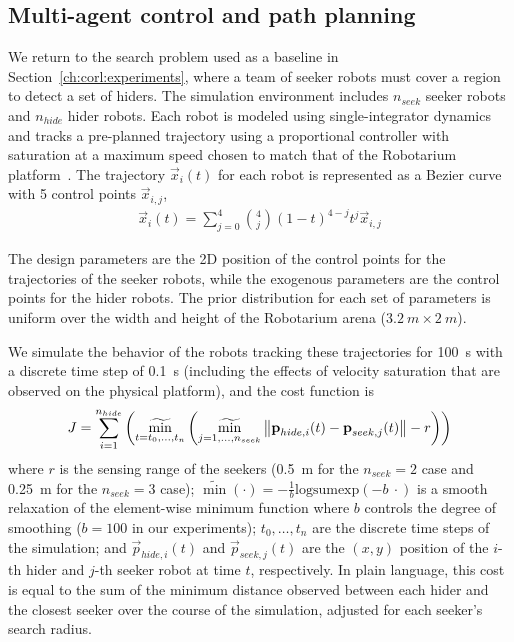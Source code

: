 \subsection{Multi-agent control and path planning}

We return to the search problem used as a baseline in Section~\ref{ch:corl:experiments}, where a team of seeker robots must cover a region to detect a set of hiders. The simulation environment includes $n_{seek}$ seeker robots and $n_{hide}$ hider robots. Each robot is modeled using single-integrator dynamics and tracks a pre-planned trajectory using a proportional controller with saturation at a maximum speed chosen to match that of the Robotarium platform~\cite{wilsonRobotariumGloballyImpactful2020}. The trajectory $\vec{x}_i(t)$ for each robot is represented as a Bezier curve with 5 control points $\vec{x}_{i, j}$,
\begin{align*}
    \vec{x}_i(t) = \sum_{j=0}^4 \binom{4}{j}(1-t)^{4-j}t^j \vec{x}_{i, j}
\end{align*}

The design parameters are the 2D position of the control points for the trajectories of the seeker robots, while the exogenous parameters are the control points for the hider robots. The prior distribution for each set of parameters is uniform over the width and height of the Robotarium arena ($\SI{3.2}{m}\times\SI{2}{m}$).

We simulate the behavior of the robots tracking these trajectories for \SI{100}{s} with a discrete time step of \SI{0.1}{s} (including the effects of velocity saturation that are observed on the physical platform), and the cost function is
\begin{align*}
    J = \sum_{i=1}^{n_{hide}}\left( \mathop{\widetilde{\min}}_{t = t_0, \ldots, t_{n}} \left( \mathop{\widetilde{\min}}_{j=1, \ldots, n_{seek}}\left\lVert\boldsymbol{\mathbf{p}}_{hide, i}(t) - \boldsymbol{\mathbf{p}}_{seek, j}(t)\right\rVert - r \right) \right)
\end{align*}
%
where $r$ is the sensing range of the seekers (\SI{0.5}{m} for the $n_{seek} = 2$ case and \SI{0.25}{m} for the $n_{seek}=3$ case); $\widetilde{\min}(\cdot) = -\frac{1}{b}\text{logsumexp}(-b\ \cdot)$ is a smooth relaxation of the element-wise minimum function where $b$ controls the degree of smoothing ($b=100$ in our experiments); $t_0, \ldots, t_{n}$ are the discrete time steps of the simulation; and $\vec{p}_{hide, i}(t)$ and $\vec{p}_{seek, j}(t)$ are the $(x, y)$ position of the $i$-th hider and $j$-th seeker robot at time $t$, respectively. In plain language, this cost is equal to the sum of the minimum distance observed between each hider and the closest seeker over the course of the simulation, adjusted for each seeker's search radius.

